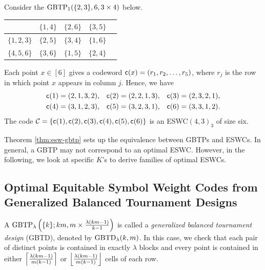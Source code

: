\documentclass[draft, 11pt]{article}
\begin{document}
 \begin{example}
\label{example2,3} Consider the $\textrm{GBTP}_1(\{2,3\},6,3\times 4)$
below.
\begin{center}
\begin{tabular}{|c|c|c|c|c|} \hline
             & $\{1,4\}$& $\{2,6\}$ & $\{3,5\}$\\ \hline
$\{1,2,3\}$  & $\{2,5\}$& $\{3,4\}$ & $\{1,6\}$\\ \hline
$\{4,5,6\}$  & $\{3,6\}$& $\{1,5\}$ & $\{2,4\}$\\ \hline
\end{tabular}
\end{center}
Each point $x\in[6]$ gives a codeword ${\sf c}(x)=(r_1,r_2,\ldots,r_5)$,
where $r_j$ is the row in which point $x$ appears in column $j$.
Hence, we have
\begin{align*}
{\sf c}(1) &= (2,1,3,2), &
{\sf c}(2) &= (2,2,1,3), &
{\sf c}(3) &= (2,3,2,1), \\
{\sf c}(4) &= (3,1,2,3), &
{\sf c}(5) &= (3,2,3,1), &
{\sf c}(6) &= (3,3,1,2).
\end{align*}
The code $\mathcal C=\{{\sf c}(1),{\sf c}(2),{\sf c}(3),{\sf c}(4),{\sf c}(5),{\sf c}(6)\}$ is an
ESWC$(4,3)_3$ %
of size six.
\end{example}

 Theorem \ref{thm:esw-gbtp} sets up the equivalence between GBTPs
 and ESWCs.
In general, a GBTP may not correspond to an optimal ESWC.
However, in the following, we look at specific $K$'s to derive
families of optimal ESWCs.


 \subsection{Optimal Equitable Symbol Weight Codes from Generalized Balanced Tournament Designs}

 A ${\rm GBTP}_\lambda\left (\{k\};km,m\times \frac{\lambda(km-1)}{k-1}\right)$ is called a
 {\em generalized balanced tournament design} (GBTD), denoted by $\textrm{GBTD}_\lambda(k,m)$.
 In this case, we check that each pair of distinct points is contained in exactly $\lambda$
 blocks and every point is contained in either
 $\left\lceil{\frac{\lambda(km-1)}{m(k-1)}}\right\rceil$ or $\left\lfloor{\frac{\lambda(km-1)}{m(k-1)}}\right\rfloor$ cells of each row.
\end{document}
